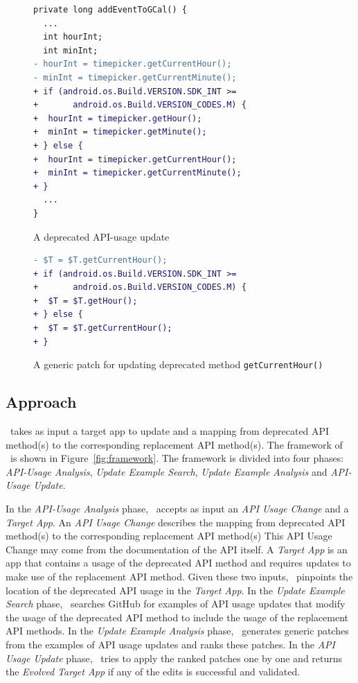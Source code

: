 \begin{figure}[htb]
\centering
\begin{lstlisting}[language=diff,numbers=none]
private long addEventToGCal() {
  ...
  int hourInt;
  int minInt;
- hourInt = timepicker.getCurrentHour();
- minInt = timepicker.getCurrentMinute();
+ if (android.os.Build.VERSION.SDK_INT >= 
+       android.os.Build.VERSION_CODES.M) {
+  hourInt = timepicker.getHour();
+  minInt = timepicker.getMinute();
+ } else {
+  hourInt = timepicker.getCurrentHour();
+  minInt = timepicker.getCurrentMinute();
+ }
  ...
}
\end{lstlisting}
\caption{A deprecated API-usage update}
\label{fig:deprecated_api_update_example}
\end{figure}

\begin{figure}[htb]
\centering
\begin{lstlisting}[language=diff,numbers=none]
- $T = $T.getCurrentHour();
+ if (android.os.Build.VERSION.SDK_INT >= 
+       android.os.Build.VERSION_CODES.M) {
+  $T = $T.getHour();
+ } else {
+  $T = $T.getCurrentHour();
+ }
\end{lstlisting}
\caption{A generic patch for updating deprecated method \texttt{getCurrentHour()}}
\label{fig:deprecated_api_update_edits}
\end{figure}

\subsection{Approach}
\toolname\ takes as input a target app to update and a mapping from 
deprecated API method(s)  to the corresponding replacement API method(s). The
framework of \toolname\ is shown in Figure~\ref{fig:framework}. The
framework is divided into four phases: {\em API-Usage Analysis}, {\em
  Update Example Search}, {\em Update Example Analysis} and {\em API-Usage
  Update}.

In the {\em API-Usage Analysis} phase, \toolname\ accepts as input an {\em
  API Usage Change} and a {\em Target App}. An {\em API Usage Change}
describes the mapping from deprecated API method(s) to the corresponding
replacement API method(s)  This API Usage Change may come from the documentation of the API itself. A {\em Target App} is an app
that contains a usage of the deprecated API method and requires updates to
make use of the replacement API method. Given these two inputs,
\toolname\ pinpoints the location of the deprecated API usage in the {\em
  Target App}. In the {\em Update Example Search} phase,
\toolname\ searches GitHub for examples of API usage updates that modify
the usage of the deprecated API method to include the usage of the
replacement API methods. In the {\em Update Example Analysis} phase,
\toolname\ generates generic patches from the examples of API usage updates and ranks these patches. In
the {\em API Usage Update} phase, \toolname\ tries to apply the ranked
patches one by one and returns the {\em Evolved Target App} if any of the
edits is successful and validated.

